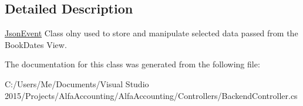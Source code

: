 \subsection{Detailed Description}
\hyperlink{class_alfa_accounting_1_1_controllers_1_1_backend_controller_1_1_json_event}{Json\+Event} Class olny used to store and manipulate selected data passed from the Book\+Dates View. 



The documentation for this class was generated from the following file\+:\begin{DoxyCompactItemize}
\item 
C\+:/\+Users/\+Me/\+Documents/\+Visual Studio 2015/\+Projects/\+Alfa\+Accounting/\+Alfa\+Accounting/\+Controllers/Backend\+Controller.\+cs\end{DoxyCompactItemize}
